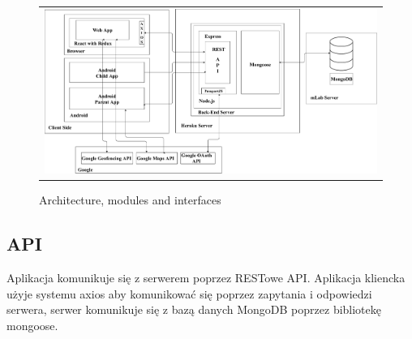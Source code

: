 \documentclass{sprawozdanie-agh}
\begin{document}
		\begin{figure}[H] 
			\centering
			\begin{tabular}{c}
				\includegraphics[width=.95\textwidth]{moduly_interfejsy_komunikacyjne}
			\end{tabular} 
			\caption{Architecture, modules and interfaces}
		\end{figure}

		\subsection{API}

			Aplikacja komunikuje się z serwerem poprzez RESTowe API. Aplikacja kliencka użyje systemu axios aby komunikować się poprzez zapytania i odpowiedzi serwera, serwer komunikuje się z bazą danych MongoDB poprzez bibliotekę mongoose.
			
\end{document}
